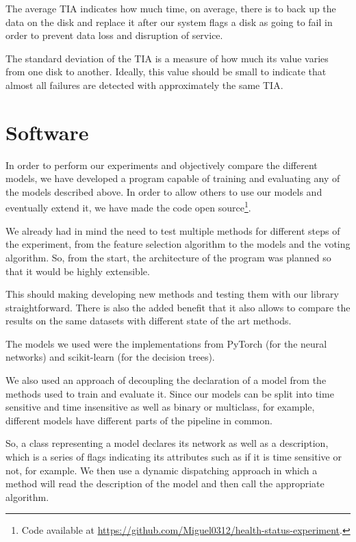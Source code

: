 The average TIA indicates how much time, on average, there is to back up the data on the disk and replace it after our system flags a disk as going to fail in order to prevent data loss and disruption of service. 

The standard deviation of the TIA is a measure of how much its value varies from one disk to another.
Ideally, this value should be small to indicate that almost all failures are detected with approximately the same TIA.

\section{Software}

In order to perform our experiments and objectively compare the different models, we have developed a program capable of training and evaluating any of the models described above.
In order to allow others to use our models and eventually extend it, we have made the code open source\footnote{Code available at \url{https://github.com/Miguel0312/health-status-experiment}.}.

We already had in mind the need to test multiple methods for different steps of the experiment, from the feature selection algorithm to the models and the voting algorithm.
So, from the start, the architecture of the program was planned so that it would be highly extensible.

This should making developing new methods and testing them with our library straightforward.
There is also the added benefit that it also allows to compare the results on the same datasets with different state of the art methods.

The models we used were the implementations from PyTorch (for the neural networks) and scikit-learn (for the decision trees).

We also used an approach of decoupling the declaration of a model from the methods used to train and evaluate it.
Since our models can be split into time sensitive and time insensitive as well as binary or multiclass, for example, different models have different parts of the pipeline in common.

So, a class representing a model declares its network as well as a description, which is a series of flags indicating its attributes such as if it is time sensitive or not, for example.
We then use a dynamic dispatching approach in which a method will read the description of the model and then call the appropriate algorithm.


